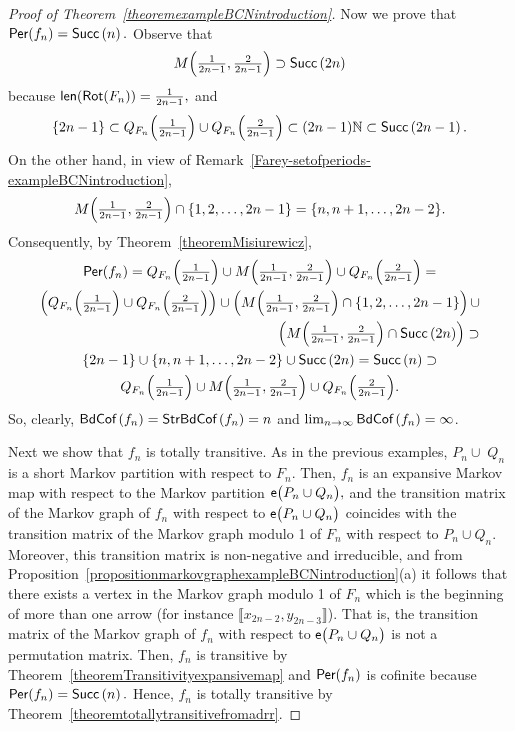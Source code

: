\documentclass[a4paper, 11pt]{amsart}
\numberwithin{equation}{section}
\theoremstyle{customnumberedtheorem}
\theoremstyle{definitionwithbfnote}
\newcommand{\N}{\ensuremath{\mathbb{N}}}
\DeclareMathOperator{\bc}{\textsf{\upshape BdCof\,}}
\DeclareMathOperator{\sbc}{\textsf{\upshape StrBdCof\,}}
\DeclareMathOperator{\len}{\textsf{\upshape len}}
\DeclareMathOperator{\Per}{\textsf{\upshape Per}}
\DeclareMathOperator{\Rot}{\textsf{\upshape Rot}}
\DeclareMathOperator{\Succ}{\textsf{\upshape Succ}}
\DeclareMathOperator{\eexp}{\textsf{\upshape e}}
\newcommand{\succs}[1]{\ensuremath{\Succ\left(#1\right)}}
\newcommand{\BIclass}[1]{\ensuremath{\llbracket #1\rrbracket}}
\newcommand{\bigemap}[1]{\ensuremath{\eexp\bigl(#1\bigr)}}
\begin{document}
\begin{proof}[Proof of Theorem~\ref{theoremexampleBCNintroduction}]
Now we prove that $\Per(f_n) = \succs{n}.$
Observe that
\[
M\Bigl(\tfrac{1}{2n-1}, \tfrac{2}{2n-1}\Bigr) \supset \succs{2n}
\]
because $\len(\Rot(F_n))=\tfrac{1}{2n-1},$ and
\[
 \{2n-1\} \subset
 Q_{F_n}\Bigl(\tfrac{1}{2n-1}\Bigr) \cup  Q_{F_n}\Bigl(\tfrac{2}{2n-1}\Bigr)
 \subset (2n-1)\N \subset \succs{2n-1}.
\]
On the other hand, in view of Remark~\ref{Farey-setofperiods-exampleBCNintroduction},
\[
 M\Bigl(\tfrac{1}{2n-1}, \tfrac{2}{2n-1}\Bigr) \cap \{1,2,\dots, 2n-1\} =
 \{n, n+1,\dots , 2n-2\}.
\]
Consequently, by Theorem~\ref{theoremMisiurewicz},
\begin{multline*}
  \Per(f_{n}) =
  Q_{F_n}\Bigl(\tfrac{1}{2n-1}\Bigr) \cup M\Bigl(\tfrac{1}{2n-1}, \tfrac{2}{2n-1}\Bigr) \cup Q_{F_n}\Bigl(\tfrac{2}{2n-1}\Bigr) =\\
  \left(Q_{F_n}\Bigl(\tfrac{1}{2n-1}\Bigr) \cup Q_{F_n}\Bigl(\tfrac{2}{2n-1}\Bigr)\right)
     \cup \left( M\Bigl(\tfrac{1}{2n-1}, \tfrac{2}{2n-1}\Bigr) \cap \{1,2,\dots, 2n-1\}\right)
     \cup\\ \hspace*{17em}\left( M\Bigl(\tfrac{1}{2n-1}, \tfrac{2}{2n-1}\Bigr) \cap \succs{2n}\right) \supset\\
  \{2n-1\} \cup  \{n, n+1,\dots , 2n-2\} \cup \succs{2n}  = \succs{n} \supset \\
  Q_{F_n}\Bigl(\tfrac{1}{2n-1}\Bigr) \cup M\Bigl(\tfrac{1}{2n-1}, \tfrac{2}{2n-1}\Bigr) \cup Q_{F_n}\Bigl(\tfrac{2}{2n-1}\Bigr).
\end{multline*}
So, clearly,
$\bc(f_n) = \sbc(f_n) = n$ and $\lim_{n\to\infty} \bc(f_n) = \infty$.

Next we show that $f_n$ is totally transitive.
As in the previous examples,
$P_n \cup\; Q_n$ is a short Markov partition with respect to $F_n.$
Then, $f_n$ is an expansive Markov map with respect to the Markov
partition $\bigemap{P_n \cup Q_n},$
and the transition matrix of the Markov graph of $f_n$
with respect to $\bigemap{P_n \cup Q_n}$
coincides with the transition matrix of the Markov graph modulo 1
of $F_n$ with respect to $P_n \cup Q_n.$ Moreover,
this transition matrix is non-negative and irreducible,
and from
Proposition~\ref{propositionmarkovgraphexampleBCNintroduction}(a)
it follows that there exists a vertex in the
Markov graph modulo 1 of $F_n$ which is the beginning of more than
one arrow (for instance $\BIclass{x_{2n-2},y_{2n-3}}$).
That is, the transition matrix of the Markov graph of $f_n$
with respect to $\bigemap{P_n \cup Q_n}$ is not
a permutation matrix.
Then, $f_n$ is transitive by Theorem~\ref{theoremTransitivityexpansivemap}
and $\Per(f_n)$ is cofinite because $\Per(f_n) = \succs{n}.$
Hence, $f_n$ is totally transitive by Theorem~\ref{theoremtotallytransitivefromadrr}.


\end{proof}
\end{document}

